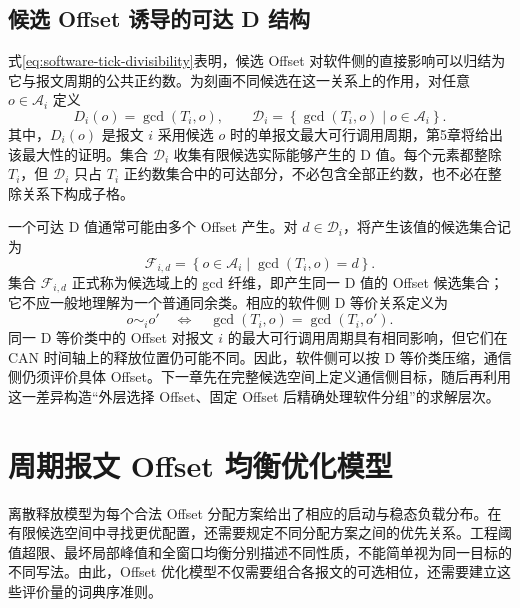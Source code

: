 \documentclass[UTF8,a4paper,twoside,zihao=-4]{ctexart}
\numberwithin{equation}{section}
\numberwithin{figure}{section}
\numberwithin{table}{section}
\theoremstyle{definition}
\newcommand{\Oset}{\mathcal{A}}
\numberwithin{algocf}{section}
\begin{document}
\subsection{候选 Offset 诱导的可达 D 结构}
\label{subsec:reachable-d-structure}

式\eqref{eq:software-tick-divisibility}表明，候选 Offset 对软件侧的直接影响可以归结为它与报文周期的公共正约数。为刻画不同候选在这一关系上的作用，对任意 $o\in\Oset_i$ 定义
\begin{equation}
 D_i(o)=\gcd(T_i,o),
 \qquad
 \mathcal D_i
 =\left\{\gcd(T_i,o)\mid o\in\Oset_i\right\}.
\label{eq:reachable-d-set}
\end{equation}
其中，$D_i(o)$ 是报文 $i$ 采用候选 $o$ 时的单报文最大可行调用周期，第5章将给出该最大性的证明。集合 $\mathcal D_i$ 收集有限候选实际能够产生的 D 值。每个元素都整除 $T_i$，但 $\mathcal D_i$ 只占 $T_i$ 正约数集合中的可达部分，不必包含全部正约数，也不必在整除关系下构成子格。

一个可达 D 值通常可能由多个 Offset 产生。对 $d\in\mathcal D_i$，将产生该值的候选集合记为
\begin{equation}
 \mathcal F_{i,d}
 =\left\{o\in\Oset_i\mid\gcd(T_i,o)=d\right\}.
\label{eq:reachable-d-fiber}
\end{equation}
集合 $\mathcal F_{i,d}$ 正式称为候选域上的 gcd 纤维，即产生同一 D 值的 Offset 候选集合；它不应一般地理解为一个普通同余类。相应的软件侧 D 等价关系定义为
\begin{equation}
 o\sim_i o'
 \quad\Longleftrightarrow\quad
 \gcd(T_i,o)=\gcd(T_i,o').
\label{eq:offset-d-equivalence}
\end{equation}
同一 D 等价类中的 Offset 对报文 $i$ 的最大可行调用周期具有相同影响，但它们在 CAN 时间轴上的释放位置仍可能不同。因此，软件侧可以按 D 等价类压缩，通信侧仍须评价具体 Offset。下一章先在完整候选空间上定义通信侧目标，随后再利用这一差异构造“外层选择 Offset、固定 Offset 后精确处理软件分组”的求解层次。

\clearpage
\section{周期报文 Offset 均衡优化模型}
\label{sec:offset-balancing-model}

离散释放模型为每个合法 Offset 分配方案给出了相应的启动与稳态负载分布。在有限候选空间中寻找更优配置，还需要规定不同分配方案之间的优先关系。工程阈值超限、最坏局部峰值和全窗口均衡分别描述不同性质，不能简单视为同一目标的不同写法。由此，Offset 优化模型不仅需要组合各报文的可选相位，还需要建立这些评价量的词典序准则。
\end{document}
